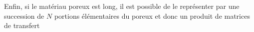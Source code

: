 %
%
%
%
%
%
%


Enfin, si le matériau poreux est long, il est possible de le représenter par une succession de $N$ portions élémentaires du poreux et donc un produit de matrices de transfert \cite{ceperley_pistonless_1979}

